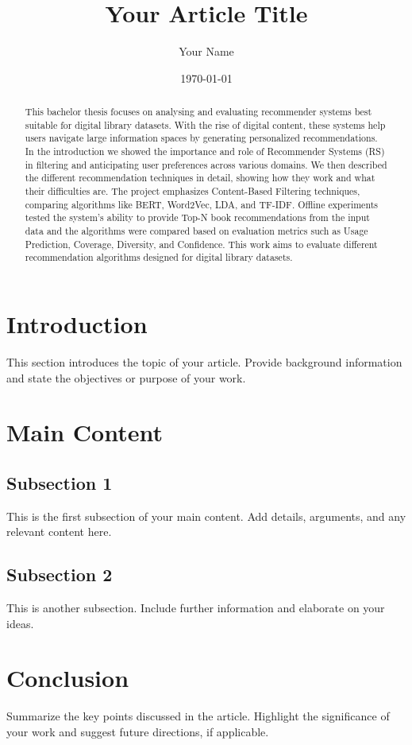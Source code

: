 \documentclass[12pt, oneside,english,hidelinks,a4paper]{article}
\title{Your Article Title}
\author{Your Name}
\date{\today} %
\begin{document}
\maketitle %

\begin{abstract}
This bachelor thesis focuses on analysing and evaluating recommender systems best suitable for digital library datasets. With the rise of digital content, these systems help users navigate large information spaces by generating personalized recommendations. In the introduction we showed the importance and role of Recommender Systems (RS) in filtering and anticipating user preferences across various domains. We then described the different recommendation techniques in detail, showing how they work and what their difficulties are. The project emphasizes Content-Based Filtering techniques, comparing algorithms like BERT, Word2Vec, LDA, and TF-IDF. Offline experiments tested the system’s ability to provide Top-N book recommendations from the input data and the algorithms were compared based on evaluation metrics such as Usage Prediction, Coverage, Diversity, and Confidence. This work aims to evaluate different recommendation algorithms designed for digital library datasets.
\end{abstract}

\section{Introduction}
This section introduces the topic of your article. Provide background information and state the objectives or purpose of your work.

\section{Main Content}
\subsection{Subsection 1}
This is the first subsection of your main content. Add details, arguments, and any relevant content here.

\subsection{Subsection 2}
This is another subsection. Include further information and elaborate on your ideas.

\section{Conclusion}
Summarize the key points discussed in the article. Highlight the significance of your work and suggest future directions, if applicable.





\clearpage 
\normalsize 
 
 
\nocite{*}
\end{document}

